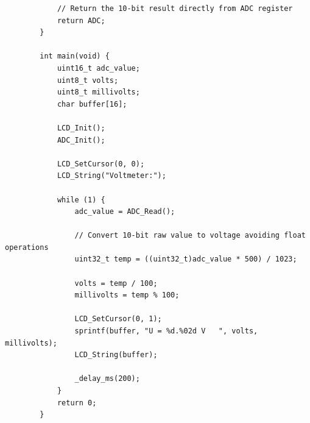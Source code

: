 \documentclass[14pt, a4paper]{extreport}
\begin{document}
\begin{verbatim}
			// Return the 10-bit result directly from ADC register
			return ADC; 
		}
		
		int main(void) {
			uint16_t adc_value;
			uint8_t volts;
			uint8_t millivolts;
			char buffer[16];
			
			LCD_Init();
			ADC_Init();
			
			LCD_SetCursor(0, 0);
			LCD_String("Voltmeter:");
			
			while (1) {
				adc_value = ADC_Read();
				
				// Convert 10-bit raw value to voltage avoiding float operations
				uint32_t temp = ((uint32_t)adc_value * 500) / 1023; 
				
				volts = temp / 100;
				millivolts = temp % 100;
				
				LCD_SetCursor(0, 1);
				sprintf(buffer, "U = %d.%02d V   ", volts, millivolts);
				LCD_String(buffer);
				
				_delay_ms(200);
			}
			return 0;
		}
	\end{verbatim}
\end{document}

